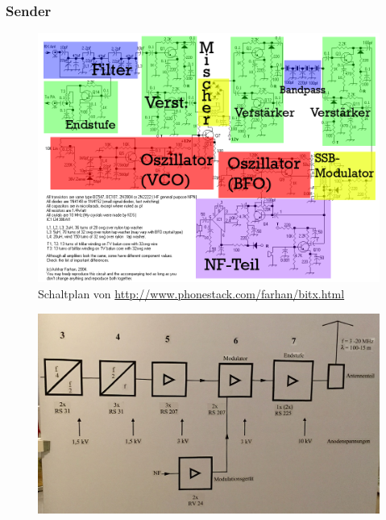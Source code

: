 \begin{frame}
  \frametitle{Sender}
  \begin{center}
    \begin{figure}
      \includegraphics[width=.95\textwidth,height=.75\textheight,keepaspectratio]{e15/bitx-farbe.png}
      \caption{Schaltplan von \ExternalLink\url{http://www.phonestack.com/farhan/bitx.html}}
    \end{figure}
  \end{center}
\end{frame}

\begin{frame}
  \begin{center}
    \begin{figure}
      \includegraphics[width=1\textwidth,height=.8\textheight,keepaspectratio]{e15/Blockschaltbild_Runfunksender_Zeesen.jpg}
    \end{figure}
  \end{center}
\end{frame}

